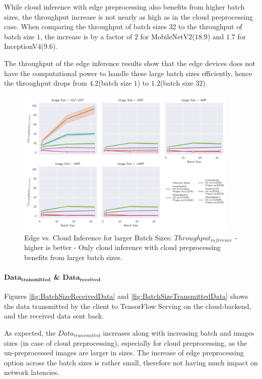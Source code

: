 While cloud inference with edge preprocessing also benefits from higher batch sizes, the throughput increase is not nearly as high as in the cloud preprocessing case.
When comparing the throughput of batch sizes $32$ to the throughput of batch size $1$, the increase is by a factor of $2$ for MobileNetV2($18.9$) and $1.7$ for InceptionV4($9.6$).

The throughput of the edge inference results show that the edge devices does not have the computational power to handle these large batch sizes efficiently, hence the throughput drops from $4.2$(batch size $1$) to $1.2$(batch size $32$).
\begin{figure}[!htb]
\centering
\includegraphics[width=0.95\textwidth]{./Bilder/single_plots/batch_size_plots/Effects_of_Batch_size_Inference_Throughput.pdf}
\caption[Edge vs. Cloud Inference for larger Batch Sizes:  $Throughput_{inference}$ - higher is better]{Edge vs. Cloud Inference for larger Batch Sizes:  $Throughput_{inference}$ - higher is better - Only cloud inference with cloud preprocessing benefits from larger batch sizes.}
\label{fig:BatchSizeInferenceThroughput}
\end{figure}

\paragraph{$\mathbf{Data_{transmitted}}$ \& $\mathbf{Data_{received}}$}
Figures \ref{fig:BatchSizeReceivedData} and \ref{fig:BatchSizeTransmittedData} shows the data transmitted by the client to TensorFlow Serving on the cloud-backend, and the received data sent back.

As expected, the $Data_{transmitted}$ increases along with increasing batch and images sizes (in case of cloud preprocessing), especially for cloud preprocessing, as the un-preprocessed images are larger in sizes.
The increase of edge preprocessing option across the batch sizes is rather small, therefore not having much impact on network latencies.

